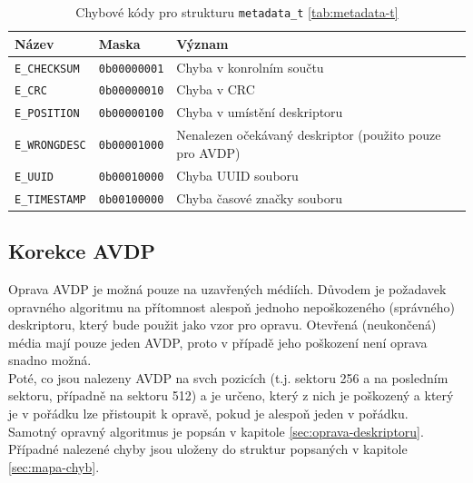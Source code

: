 \begin{table}
    \begin{tabular}{ | l | l | l | }
        \hline
        Název & Maska & Význam \\ \hline
        \texttt{E\_CHECKSUM} & \texttt{0b00000001} & Chyba v konrolním součtu \\ \hline
        \texttt{E\_CRC}      & \texttt{0b00000010} & Chyba v CRC \\ \hline
        \texttt{E\_POSITION} & \texttt{0b00000100} & Chyba v umístění deskriptoru\\ \hline
        \texttt{E\_WRONGDESC}& \texttt{0b00001000} & Nenalezen očekávaný deskriptor (použito pouze pro AVDP)\\ \hline
        \texttt{E\_UUID}     & \texttt{0b00010000} & Chyba UUID souboru \\ \hline
        \texttt{E\_TIMESTAMP}& \texttt{0b00100000} & Chyba časové značky souboru\\ \hline
    \end{tabular}
    \caption{Chybové kódy pro strukturu \texttt{metadata\_t} \ref{tab:metadata-t}\label{tab:E-codes}}
\end{table}
\subsection{Korekce AVDP}
\label{sec:oprava-avdp}
Oprava AVDP je možná pouze na uzavřených médiích. Důvodem je požadavek opravného algoritmu na přítomnost alespoň jednoho nepoškozeného (správného) deskriptoru, který bude použit jako vzor pro opravu. Otevřená (neukončená) média mají pouze jeden AVDP, proto v případě jeho poškození není oprava snadno možná.\\
Poté, co jsou nalezeny AVDP na svch pozicích (t.j. sektoru 256 a na posledním sektoru, případně na sektoru 512) a je určeno, který z nich je poškozený a který je v pořádku lze přistoupit k opravě, pokud je alespoň jeden v pořádku.\\
Samotný opravný algoritmus je popsán v kapitole \ref{sec:oprava-deskriptoru}.\\
Případné nalezené chyby jsou uloženy do struktur popsaných v kapitole \ref{sec:mapa-chyb}.\\

